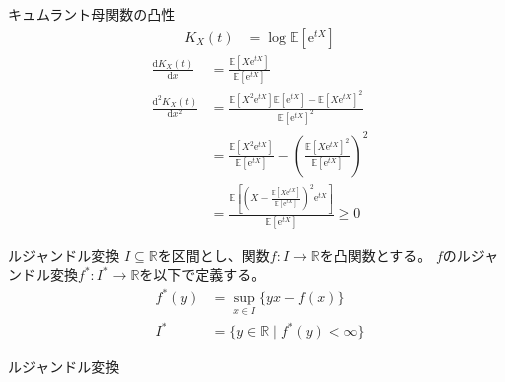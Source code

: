 \documentclass[lualatex,handout]{beamer}
\newcommand{\expt}[1]{\mathbb{E}\left[#1\right]}
\theoremstyle{definition}
\begin{document}
\begin{frame}{キュムラント母関数の凸性}
\begin{align*}
K_X(t) &= \log \expt{\mathrm{e}^{tX}}
\end{align*}
\begin{align*}
\frac{\mathrm{d} K_X(t)}{\mathrm{d}x} &= \frac{\expt{X\mathrm{e}^{tX}}}{\expt{\mathrm{e}^{tX}}}\\
\frac{\mathrm{d}^2 K_X(t)}{\mathrm{d}x^2} &= \frac{\expt{X^2\mathrm{e}^{tX}}\expt{\mathrm{e}^{tX}}-\expt{X\mathrm{e}^{tX}}^2}{\expt{\mathrm{e}^{tX}}^2}\\
&= \frac{\expt{X^2\mathrm{e}^{tX}}}{\expt{\mathrm{e}^{tX}}}-\left(\frac{\expt{X\mathrm{e}^{tX}}^2}{\expt{\mathrm{e}^{tX}}}\right)^2\\
&= \frac{\expt{\left(X-\frac{\expt{X\mathrm{e}^{tX}}}{\expt{\mathrm{e}^{tX}}}\right)^2\mathrm{e}^{tX}}}{\expt{\mathrm{e}^{tX}}}\ge 0
\end{align*}
\end{frame}

\begin{frame}{ルジャンドル変換}
$I\subseteq\mathbb{R}$を区間とし、関数$f\colon I\to\mathbb{R}$を凸関数とする。
$f$のルジャンドル変換$f^*\colon I^*\to\mathbb{R}$を以下で定義する。
\begin{align*}
f^*(y) &= \sup_{x\in I}\{yx - f(x)\}\\
I^*&=\{y\in\mathbb{R}\mid f^*(y)<\infty\}
\end{align*}
\end{frame}

\begin{frame}{ルジャンドル変換}
\centering
{}
\end{frame}
\end{document}
